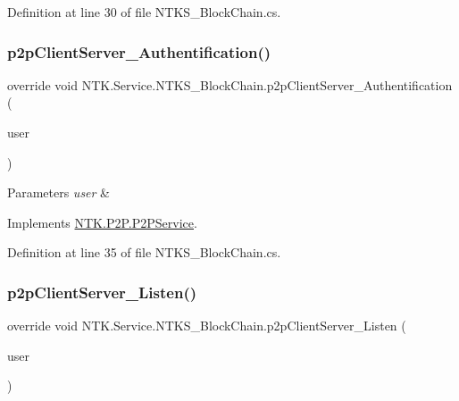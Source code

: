 Definition at line 30 of file N\+T\+K\+S\+\_\+\+Block\+Chain.\+cs.

\mbox{\label{class_n_t_k_1_1_service_1_1_n_t_k_s___block_chain_a11c27887bafddcdae6f943ebe11a3462}} 
\subsubsection{\texorpdfstring{p2pClientServer\_Authentification()}{p2pClientServer\_Authentification()}}
{\footnotesize\ttfamily override void N\+T\+K.\+Service.\+N\+T\+K\+S\+\_\+\+Block\+Chain.\+p2p\+Client\+Server\+\_\+\+Authentification (\begin{DoxyParamCaption}\item[{\mbox{\hyperlink{class_n_t_k_1_1_n_t_k_user}{N\+T\+K\+User}}}]{user }\end{DoxyParamCaption})\hspace{0.3cm}{\ttfamily [virtual]}}






\begin{DoxyParams}{Parameters}
{\em user} & \\
\hline
\end{DoxyParams}


Implements \mbox{\hyperlink{class_n_t_k_1_1_p2_p_1_1_p2_p_service_ac4adf79dade09cfcbb37a74632cdc6c2}{N\+T\+K.\+P2\+P.\+P2\+P\+Service}}.



Definition at line 35 of file N\+T\+K\+S\+\_\+\+Block\+Chain.\+cs.

\mbox{\label{class_n_t_k_1_1_service_1_1_n_t_k_s___block_chain_aa3fedcf07d1cac1d60215c425930b1f0}} 
\subsubsection{\texorpdfstring{p2pClientServer\_Listen()}{p2pClientServer\_Listen()}}
{\footnotesize\ttfamily override void N\+T\+K.\+Service.\+N\+T\+K\+S\+\_\+\+Block\+Chain.\+p2p\+Client\+Server\+\_\+\+Listen (\begin{DoxyParamCaption}\item[{\mbox{\hyperlink{class_n_t_k_1_1_n_t_k_user}{N\+T\+K\+User}}}]{user }\end{DoxyParamCaption})\hspace{0.3cm}{\ttfamily [virtual]}}






